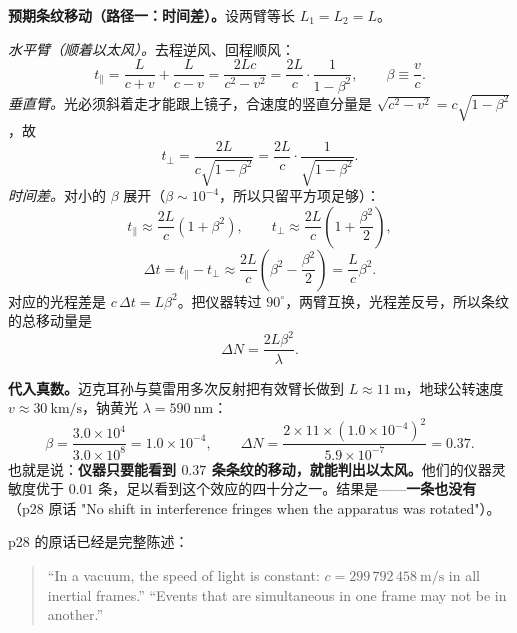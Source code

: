 \documentclass[11pt]{ctexart}
\newcommand{\cpage}[1]{\textsf{p#1}}
\begin{document}

\textbf{预期条纹移动（路径一：时间差）。}设两臂等长 $L_1=L_2=L$。

\emph{水平臂（顺着以太风）。}去程逆风、回程顺风：
\[
t_\parallel=\frac{L}{c+v}+\frac{L}{c-v}=\frac{2Lc}{c^2-v^2}=\frac{2L}{c}\cdot\frac{1}{1-\beta^2},
\qquad \beta\equiv\frac{v}{c}.
\]
\emph{垂直臂。}光必须斜着走才能跟上镜子，合速度的竖直分量是 $\sqrt{c^2-v^2}=c\sqrt{1-\beta^2}$，故
\[
t_\perp=\frac{2L}{c\sqrt{1-\beta^2}}=\frac{2L}{c}\cdot\frac{1}{\sqrt{1-\beta^2}}.
\]
\emph{时间差。}对小的 $\beta$ 展开（$\beta\sim10^{-4}$，所以只留平方项足够）：
\[
t_\parallel\approx\frac{2L}{c}(1+\beta^2),\qquad
t_\perp\approx\frac{2L}{c}\left(1+\frac{\beta^2}{2}\right),
\]
\[
\Delta t=t_\parallel-t_\perp\approx\frac{2L}{c}\left(\beta^2-\frac{\beta^2}{2}\right)=\frac{L}{c}\beta^2 .
\]
对应的光程差是 $c\,\Delta t=L\beta^2$。把仪器转过 $90^\circ$，两臂互换，光程差反号，所以条纹的总移动量是
\[
\Delta N=\frac{2L\beta^2}{\lambda}.
\]

\textbf{代入真数。}迈克耳孙与莫雷用多次反射把有效臂长做到 $L\approx11\ \mathrm{m}$，地球公转速度 $v\approx30\ \mathrm{km/s}$，钠黄光 $\lambda=590\ \mathrm{nm}$：
\[
\beta=\frac{3.0\times10^{4}}{3.0\times10^{8}}=1.0\times10^{-4},\qquad
\Delta N=\frac{2\times11\times(1.0\times10^{-4})^2}{5.9\times10^{-7}}=0.37 .
\]
也就是说：\textbf{仪器只要能看到 $0.37$ 条条纹的移动，就能判出以太风。}他们的仪器灵敏度优于 $0.01$ 条，足以看到这个效应的四十分之一。结果是——\textbf{一条也没有}（\cpage{28} 原话 "No shift in interference fringes when the apparatus was rotated"）。


\subhdr{5.3 爱因斯坦的两条假设（\cpage{28}）}

\cpage{28} 的原话已经是完整陈述：

\begin{quote}
``In a vacuum, the speed of light is constant: $c=299\,792\,458\ \mathrm{m/s}$ in all inertial frames.''
``Events that are simultaneous in one frame may not be in another.''
\end{quote}
\end{document}
